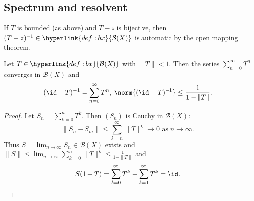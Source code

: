 \documentclass{article}
\begin{document}
\subsection{Spectrum and resolvent}

\begin{remark}
    If $T$ is bounded (as above) and $T-z$ is bijective, then $(T-z)^{-1} \in \hyperlink{def:bx}{\mathcal{B}(X)}$ is automatic by the \hyperlink{thm:omt}{open mapping theorem}.
\end{remark}

\begin{fact}
    Let $T \in \hyperlink{def:bx}{\mathcal{B}(X)}$ with $\|T\| < 1$.
    Then the series $\sum_{n=0}^\infty T^n$ converges in $\mathcal{B}(X)$ and
    \begin{equation*}
        (\id -T)^{-1} = \sum_{n=0}^\infty T^n, \; \norm{(\id - T)^{-1}} \leq \frac{1}{1 - \|T\|}.
    \end{equation*}
\end{fact}

\begin{proof}
    Let $S_n = \sum_{k=0}^n T^k$. Then $(S_n)$ is Cauchy in $\mathcal{B}(X)$:
    \begin{equation*}
        \|S_n - S_m\| \leq \sum_{k=n}^\infty \|T\|^k \to 0 \text{ as } n \to \infty.
    \end{equation*}
    Thus $S = \lim_{n \to \infty} S_n \in \mathcal{B}(X)$ exists and $\|S\| \leq \lim_{n \to \infty} \sum_{k=0}^n \|T\|^k \leq \frac{1}{1 - \|T\|}$ and
    \begin{equation*}
        S(1-T) = \sum_{k=0}^\infty T^k - \sum_{k=1}^\infty T^k = \id. \qedhere
    \end{equation*}
\end{proof}
\end{document}

